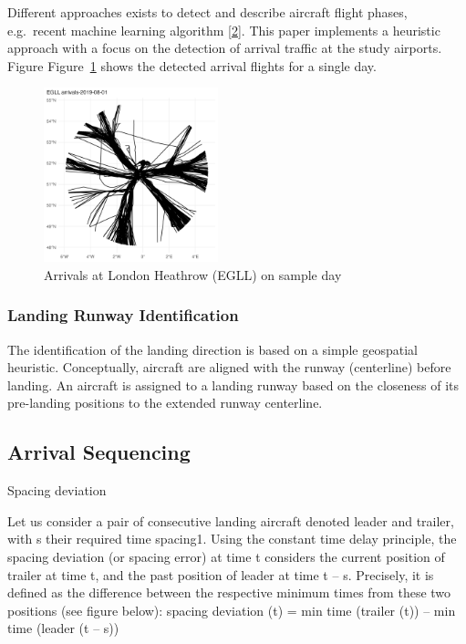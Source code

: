 \documentclass[letterpaper, 10 pt, journal, twoside]{IEEEtran}
\begin{document}
Different approaches exists to detect and describe aircraft flight
phases, e.g.~recent machine learning algorithm
\protect\hyperlink{ref-sun2017flightphase}{{[}2{]}}. This paper
implements a heuristic approach with a focus on the detection of arrival
traffic at the study airports. Figure Figure~\ref{fig-EGLL-arrivals}
shows the detected arrival flights for a single day.

\begin{figure}

{\centering \includegraphics[width=0.45\textwidth,height=\textheight]{./figures/EGLL-arrivals-single-day.png}

}

\caption{\label{fig-EGLL-arrivals}Arrivals at London Heathrow (EGLL) on
sample day}

\end{figure}

\hypertarget{landing-runway-identification}{%
\subsubsection{Landing Runway
Identification}\label{landing-runway-identification}}

The identification of the landing direction is based on a simple
geospatial heuristic. Conceptually, aircraft are aligned with the runway
(centerline) before landing. An aircraft is assigned to a landing runway
based on the closeness of its pre-landing positions to the extended
runway centerline.

\hypertarget{arrival-sequencing}{%
\subsection{Arrival Sequencing}\label{arrival-sequencing}}

Spacing deviation

Let us consider a pair of consecutive landing aircraft denoted leader
and trailer, with s their required time spacing1. Using the constant
time delay principle, the spacing deviation (or spacing error) at time t
considers the current position of trailer at time t, and the past
position of leader at time t -- s. Precisely, it is defined as the
difference between the respective minimum times from these two positions
(see figure below): spacing deviation (t) = min time (trailer (t)) --
min time (leader (t -- s))
\end{document}

